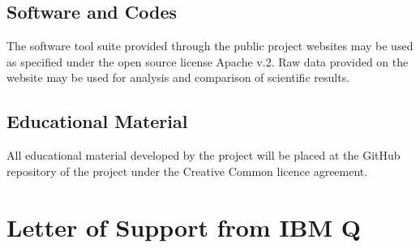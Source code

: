 \documentclass[11pt]{article}
\begin{document}
\subsection{Software and Codes}
The software tool suite provided through the public project websites may be used as specified
under the open source license Apache v.2. Raw data provided on the website may be used for
analysis and comparison of scientific results.
\subsection{Educational Material}
All educational material developed by the project will be placed at the GitHub repository of the project under the Creative Common licence agreement.

\clearpage
\section{Letter of Support from IBM Q}


\end{document}
